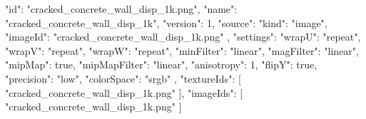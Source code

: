 {
  "id": "cracked_concrete_wall_disp_1k.png",
  "name": "cracked_concrete_wall_disp_1k",
  "version": 1,
  "source": {
    "kind": "image",
    "imageId": "cracked_concrete_wall_disp_1k.png"
  },
  "settings": {
    "wrapU": "repeat",
    "wrapV": "repeat",
    "wrapW": "repeat",
    "minFilter": "linear",
    "magFilter": "linear",
    "mipMap": true,
    "mipMapFilter": "linear",
    "anisotropy": 1,
    "flipY": true,
    "precision": "low",
    "colorSpace": "srgb"
  },
  "textureIds": [
    "cracked_concrete_wall_disp_1k.png"
  ],
  "imageIds": [
    "cracked_concrete_wall_disp_1k.png"
  ]
}
